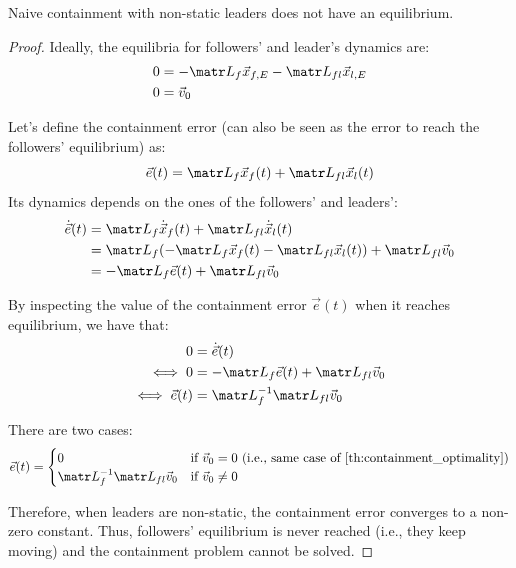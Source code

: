 \begin{theorem}
    Naive containment with non-static leaders does not have an equilibrium.

    \begin{proof}
        Ideally, the equilibria for followers' and leader's dynamics are:
        \[
            \begin{split}
                0 &= -\lap_f \x_{f,E} - \lap_{fl} \x_{l,E} \\
                0 &= \vec{v}_0
            \end{split}
        \]

        Let's define the containment error (can also be seen as the error to reach the followers' equilibrium) as:
        \[
            \vec{e}(t) = \lap_f \x_f(t) + \lap_{fl} \x_l(t)
        \]
        Its dynamics depends on the ones of the followers' and leaders':
        \[
            \begin{split}
                \dot{\vec{e}}(t) &= \lap_f \dot{\x}_f(t) + \lap_{fl} \dot{\x}_l(t) \\
                &= \lap_f (- \lap_f \x_f(t) - \lap_{fl} \x_l(t)) + \lap_{fl} \vec{v}_0 \\
                &= - \lap_f \vec{e}(t) + \lap_{fl} \vec{v}_0
            \end{split}
        \]
        
        By inspecting the value of the containment error $\vec{e}(t)$ when it reaches equilibrium, we have that:
        \[
            \begin{split}
                0 &= \dot{\vec{e}}(t) \\
                \iff 0 &= - \lap_f \vec{e}(t) + \lap_{fl} \vec{v}_0 \\
                \iff \vec{e}(t) &= \lap_f^{-1} \lap_{fl} \vec{v}_0 \\
            \end{split}
        \]
        
        There are two cases:
        \[
            \vec{e}(t) = \begin{cases}
                0 & \text{if $\vec{v}_0 = 0$ (i.e., same case of \Cref{th:containment_optimality})} \\
                \lap_f^{-1} \lap_{fl} \vec{v}_0 & \text{if $\vec{v}_0 \neq 0$} \\
            \end{cases}
        \]

        Therefore, when leaders are non-static, the containment error converges to a non-zero constant. Thus, followers' equilibrium is never reached (i.e., they keep moving) and the containment problem cannot be solved.
    \end{proof}
\end{theorem}



